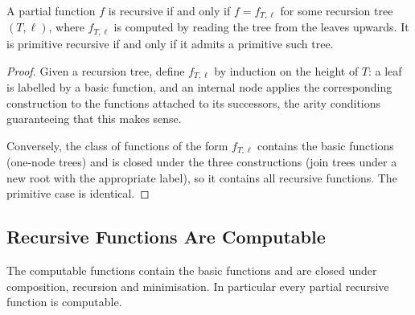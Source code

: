 \begin{theorem}
	A partial function $f$ is recursive if and only if $f = f_{T,\ell}$ for some recursion tree $(T,\ell)$, where $f_{T,\ell}$ is computed by reading the tree from the leaves upwards. It is primitive recursive if and only if it admits a primitive such tree.
\end{theorem}

\begin{proof}
	Given a recursion tree, define $f_{T,\ell}$ by induction on the height of $T$: a leaf is labelled by a basic function, and an internal node applies the corresponding construction to the functions attached to its successors, the arity conditions guaranteeing that this makes sense.

	Conversely, the class of functions of the form $f_{T,\ell}$ contains the basic functions (one-node trees) and is closed under the three constructions (join trees under a new root with the appropriate label), so it contains all recursive functions. The primitive case is identical.
\end{proof}

\subsection{Recursive Functions Are Computable}

\begin{theorem}\label{thm:recursivecomputable}
	The computable functions contain the basic functions and are closed under composition, recursion and minimisation. In particular every partial recursive function is computable.
\end{theorem}

